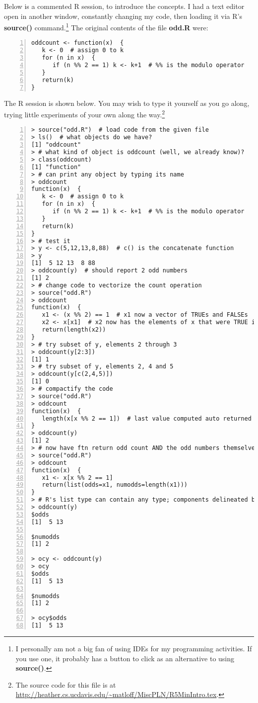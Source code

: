 Below is a commented R session, to introduce the concepts. I had a text
editor open in another window, constantly changing my code, then loading
it via R's {\bf source()} command.\footnote{I personally am not a big
fan of using IDEs for my programming activities.  If you use one, it
probably has a button to click as an alternative to using {\bf
source()}.} The original contents of the file {\bf odd.R} were:

\begin{lstlisting}[numbers=left]
oddcount <- function(x)  {
   k <- 0  # assign 0 to k
   for (n in x)  {
      if (n %% 2 == 1) k <- k+1  # %% is the modulo operator
   }
   return(k)
}
\end{lstlisting}

The R session is shown below.  You may wish to type it yourself as you
go along, trying little experiments of your own along the
way.\footnote{The source code for this file is at
\url{http://heather.cs.ucdavis.edu/~matloff/MiscPLN/R5MinIntro.tex}.}

\begin{lstlisting}[numbers=left]
> source("odd.R")  # load code from the given file
> ls()  # what objects do we have?
[1] "oddcount"
> # what kind of object is oddcount (well, we already know)?
> class(oddcount)
[1] "function"
> # can print any object by typing its name
> oddcount
function(x)  {
   k <- 0  # assign 0 to k
   for (n in x)  {
      if (n %% 2 == 1) k <- k+1  # %% is the modulo operator
   }
   return(k)
}
> # test it
> y <- c(5,12,13,8,88)  # c() is the concatenate function
> y
[1]  5 12 13  8 88
> oddcount(y)  # should report 2 odd numbers
[1] 2
> # change code to vectorize the count operation
> source("odd.R")
> oddcount
function(x)  {
   x1 <- (x %% 2) == 1  # x1 now a vector of TRUEs and FALSEs
   x2 <- x[x1]  # x2 now has the elements of x that were TRUE in x1
   return(length(x2))
}
> # try subset of y, elements 2 through 3
> oddcount(y[2:3])
[1] 1
> # try subset of y, elements 2, 4 and 5
> oddcount(y[c(2,4,5)])
[1] 0
> # compactify the code
> source("odd.R")
> oddcount
function(x)  {
   length(x[x %% 2 == 1])  # last value computed auto returned
}
> oddcount(y)
[1] 2
> # now have ftn return odd count AND the odd numbers themselves
> source("odd.R")
> oddcount
function(x)  {
   x1 <- x[x %% 2 == 1]
   return(list(odds=x1, numodds=length(x1)))
}
> # R's list type can contain any type; components delineated by $
> oddcount(y)
$odds
[1]  5 13

$numodds
[1] 2

> ocy <- oddcount(y)
> ocy
$odds
[1]  5 13

$numodds
[1] 2

> ocy$odds
[1]  5 13
\end{lstlisting}

